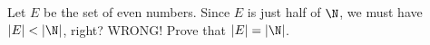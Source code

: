 Let $E$ be the set of even numbers. Since $E$ is just half of $\N$,
we must have $|E| < |\N|$, right? WRONG! Prove that $|E| = |\N|$.
